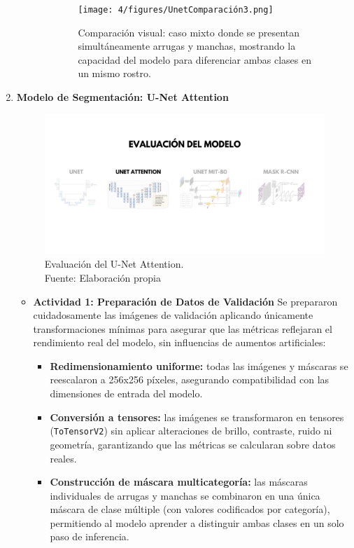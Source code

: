 \begin{enumerate}
\begin{itemize}
\begin{itemize}
\begin{figure}[H]
\centering
\texttt{[image: 4/figures/UnetComparación3.png]}
\caption{Comparación visual: caso mixto donde se presentan simultáneamente arrugas y manchas, mostrando la capacidad del modelo para diferenciar ambas clases en un mismo rostro.}
\label{fig:validacion33}
\end{figure}
\end{itemize}

  \end{itemize}
  \newpage
  \item \textbf{Modelo de Segmentación: U-Net Attention}
  \begin{figure}[H]
	\begin{center}
		\includegraphics[width=1\textwidth]{4/figures/evunetat.png}
		\caption[Evaluación del U-Net Attention]{Evaluación del U-Net Attention.\\
		Fuente: Elaboración propia}
		\label{4:figevunetat}
	\end{center}
\end{figure}
  \begin{itemize}
  \item\textbf{Actividad 1: Preparación de Datos de Validación}
  Se prepararon cuidadosamente las imágenes de validación aplicando únicamente transformaciones mínimas para asegurar que las métricas reflejaran el rendimiento real del modelo, sin influencias de aumentos artificiales:
\begin{itemize}
  \item \textbf{Redimensionamiento uniforme:} todas las imágenes y máscaras se reescalaron a 256x256 píxeles, asegurando compatibilidad con las dimensiones de entrada del modelo.
  \item \textbf{Conversión a tensores:} las imágenes se transformaron en tensores (\texttt{ToTensorV2}) sin aplicar alteraciones de brillo, contraste, ruido ni geometría, garantizando que las métricas se calcularan sobre datos reales.
  \item \textbf{Construcción de máscara multicategoría:} las máscaras individuales de arrugas y manchas se combinaron en una única máscara de clase múltiple (con valores codificados por categoría), permitiendo al modelo aprender a distinguir ambas clases en un solo paso de inferencia.
\end{itemize}


\end{itemize}
\end{enumerate}
